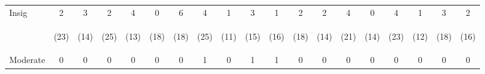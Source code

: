 \begin{tabular}{lcccccccccccccccccc}
\hline \noalign{\smallskip}Insig & 2 & 3 & 2 & 4 & 0 & 6 & 4 & 1 & 3 & 1 & 2 & 2 & 4 & 0 & 4 & 1 & 3 & 2\\
 & \begin{footnotesize}(23)\end{footnotesize} & \begin{footnotesize}(14)\end{footnotesize} & \begin{footnotesize}(25)\end{footnotesize} & \begin{footnotesize}(13)\end{footnotesize} & \begin{footnotesize}(18)\end{footnotesize} & \begin{footnotesize}(18)\end{footnotesize} & \begin{footnotesize}(25)\end{footnotesize} & \begin{footnotesize}(11)\end{footnotesize} & \begin{footnotesize}(15)\end{footnotesize} & \begin{footnotesize}(16)\end{footnotesize} & \begin{footnotesize}(18)\end{footnotesize} & \begin{footnotesize}(14)\end{footnotesize} & \begin{footnotesize}(21)\end{footnotesize} & \begin{footnotesize}(14)\end{footnotesize} & \begin{footnotesize}(23)\end{footnotesize} & \begin{footnotesize}(12)\end{footnotesize} & \begin{footnotesize}(18)\end{footnotesize} & \begin{footnotesize}(16)\end{footnotesize}\\
\noalign{\smallskip}Moderate & 0 & 0 & 0 & 0 & 0 & 0 & 1 & 0 & 1 & 1 & 0 & 0 & 0 & 0 & 0 & 0 & 0 & 0\\

\end{tabular}
